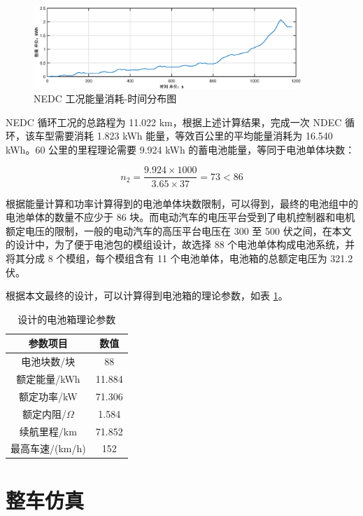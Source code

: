 \begin{figure}
 \centering
 \includegraphics[width=0.9\textwidth]{figures/NEDCe.eps}
 \caption{NEDC 工况能量消耗-时间分布图}\label{fig:NEDCe}
\end{figure}

NEDC 循环工况的总路程为 11.022 km，根据上述计算结果，完成一次 NDEC 循环，该车型需要消耗 1.823 kWh 能量，等效百公里的平均能量消耗为 16.540 kWh。60 公里的里程理论需要 9.924 kWh 的蓄电池能量，等同于电池单体块数：

\begin{equation}
	n_2=\frac{9.924\times 1000}{3.65 \times 37}=73 < 86
\end{equation}

根据能量计算和功率计算得到的电池单体块数限制，可以得到，最终的电池组中的电池单体的数量不应少于 86 块。而电动汽车的电压平台受到了电机控制器和电机额定电压的限制，一般的电动汽车的高压平台电压在 300 至 500 伏之间，在本文的设计中，为了便于电池包的模组设计，故选择 88 个电池单体构成电池系统，并将其分成 8 个模组，每个模组含有 11 个电池单体，电池箱的总额定电压为 321.2 伏。

根据本文最终的设计，可以计算得到电池箱的理论参数，如表 \ref{tab:box}。

\begin{table}
	\centering
	\caption{设计的电池箱理论参数} \label{tab:box}
	\begin{tabular*}{0.9\textwidth}{@{\extracolsep{\fill}}cc}
		\toprule
		参数项目			&数值		 \\
		\midrule
		电池块数/块	     &88  \\
		额定能量/kWh     &11.884  \\
		额定功率/kW      &71.306  \\
		额定内阻/$\Omega$ &1.584  \\
		续航里程/km      &71.852  \\
        最高车速/(km/h)  &152   \\
		\bottomrule
	\end{tabular*}
\end{table}

\section{整车仿真}

